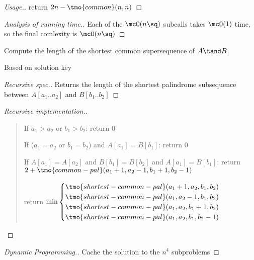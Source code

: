 \documentclass{article}
\begin{document}
\begin{proof}[Usage.]
return \( 2n - \tmo{common}(n,n) \)
\end{proof}

\begin{proof}[Analysis of running time.]
Each of the \( \mcO(n\sq) \) subcalls takes \( \mcO(1) \) time, so the final comlexity is \( \mcO(n\sq) \)
\end{proof}
\pagebreak

\begin{subexercise} %
  Compute the length of the shortest common supersequence of \( A \tand B \).
\end{subexercise}

\begin{note}
  Based on solution key
\end{note}

\begin{proof}[Recursive spec.]
  Returns the length of the shortest palindrome subsequence between \( A[a_1..a_2] \) and \( B[b_1..b_2] \)
\end{proof}

\begin{proof}[Recursive implementation.]\
\begin{quote}
\begin{steps}
  \item If \( a_1 > a_2 \) or \( b_1 > b_2 \): return 0
  \item If (\( a_1 = a_2 \) or \( b_1 = b_2 \)) and \( A[a_1] = B[b_1] \): return 0
  \item If \( A[a_1] = A[a_2] \) and \( B[b_1] = B[b_2] \) and \( A[a_1] = B[b_1] \): return \( 2+\tmo{common-pal}(a_1+1, a_2-1, b_1+1, b_2-1) \)
  \item return $\min\begin{cases}
    \tmo{shortest-common-pal}(a_1+1,a_2,b_1,b_2) \\
    \tmo{shortest-common-pal}(a_1,a_2-1,b_1,b_2) \\
    \tmo{shortest-common-pal}(a_1,a_2,b_1+1,b_2) \\
    \tmo{shortest-common-pal}(a_1,a_2,b_1,b_2-1)
  \end{cases}$
\end{steps}
\end{quote}
\end{proof}

\begin{proof}[Dynamic Programming.]
  Cache the solution to the \( n^4 \) subproblems
\end{proof}
\end{document}
